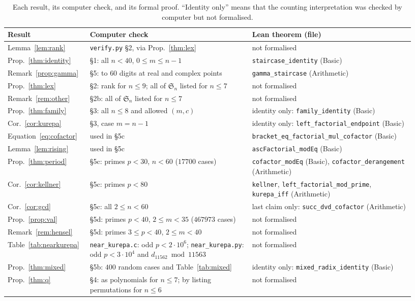 \documentclass[11pt]{amsart}
\theoremstyle{plain}
\theoremstyle{definition}
\theoremstyle{remark}
\newcommand{\Sym}{\mathfrak{S}}
\begin{document}
\begin{table}[!ht]
\centering
\footnotesize
\begin{tabular}{@{}>{\raggedright\arraybackslash}p{0.17\linewidth}>{\raggedright\arraybackslash}p{0.38\linewidth}>{\raggedright\arraybackslash}p{0.38\linewidth}@{}}
\toprule
Result & Computer check & Lean theorem (file)\\
\midrule
Lemma~\ref{lem:rank} & \texttt{verify.py} \S2, via Prop.~\ref{thm:lex} & not formalised\\
Prop.~\ref{thm:identity} & \S1: all $n<40$, $0\le m\le n-1$ & \texttt{staircase\_identity} (Basic)\\
Remark~\ref{prop:gamma} & \S5: to $60$ digits at real and complex points & \texttt{gamma\_staircase} (Arithmetic)\\
Prop.~\ref{thm:lex} & \S2: rank for $n\le9$; all of $\Sym_n$ listed for $n\le7$ & not formalised\\
Remark~\ref{rem:other} & \S2b: all of $\Sym_n$ listed for $n\le7$ & not formalised\\
Prop.~\ref{thm:family} & \S3: all $n\le8$ and allowed $(m,c)$ & identity only: \texttt{family\_identity} (Basic)\\
Cor.~\ref{cor:kurepa} & \S3, case $m=n-1$ & identity only: \texttt{left\_factorial\_endpoint} (Basic)\\
Equation~\eqref{eq:cofactor} & used in \S5c & \texttt{bracket\_eq\_factorial\_mul\_cofactor} (Basic)\\
Lemma~\ref{lem:rising} & used in \S5c & \texttt{ascFactorial\_modEq} (Basic)\\
Prop.~\ref{thm:period} & \S5c: primes $p<30$, $n<60$ ($17700$ cases) & \texttt{cofactor\_modEq} (Basic), \texttt{cofactor\_derangement} (Arithmetic)\\
Cor.~\ref{cor:kellner} & \S5c: primes $p<80$ & \texttt{kellner}, \texttt{left\_factorial\_mod\_prime}, \texttt{kurepa\_iff} (Arithmetic)\\
Cor.~\ref{cor:gcd} & \S5c: all $2\le n<60$ & last claim only: \texttt{succ\_dvd\_cofactor} (Arithmetic)\\
Prop.~\ref{prop:val} & \S5d: primes $p<40$, $2\le m<35$ ($467973$ cases) & not formalised\\
Remark~\ref{rem:hensel} & \S5d: primes $3\le p<40$, $2\le m<40$ & not formalised\\
Table~\ref{tab:nearkurepa} & \texttt{near\_kurepa.c}: odd $p<2\cdot10^6$; \texttt{near\_kurepa.py}: odd $p<3\cdot10^4$ and $d_{11562}\bmod 11563$ & not formalised\\
Prop.~\ref{thm:mixed} & \S5b: $400$ random cases and Table~\ref{tab:mixed} & identity only: \texttt{mixed\_radix\_identity} (Basic)\\
Prop.~\ref{thm:q} & \S4: as polynomials for $n\le7$; by listing permutations for $n\le6$ & not formalised\\
\bottomrule
\end{tabular}
\caption{Each result, its computer check, and its formal proof. ``Identity
only'' means that the counting interpretation was checked by computer but not
formalised.}
\label{tab:checks}
\end{table}
\end{document}
